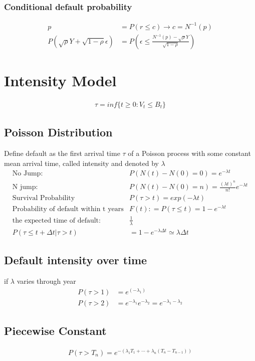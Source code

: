\documentclass{article}
\theoremstyle{definition}
\theoremstyle{thrm}
\theoremstyle{lma}
\theoremstyle{ppst}
\theoremstyle{crlr}
\begin{document}
\subsubsection{Conditional default probability}
\begin{align}
	p &= P(r\leq c) \rightarrow c = N^{-1}(p)\\
	P(\sqrt{\rho}Y+\sqrt{1-\rho}\epsilon) &= P(\epsilon \leq \frac{N^{-1}(p) - \sqrt{\rho} Y}{\sqrt{1-\rho}})
\end{align}

\section{Intensity Model}
\begin{align*}
	\tau = inf\{t\geq0: V_t \leq B_t\}
\end{align*}
\subsection{Poisson Distribution}
Define default as the first arrival time $\tau$ of a Poisson process with some constant mean arrival time, called intensity and denoted by $\lambda$
\begin{align*}
	\text{No Jump: }& P(N(t)-N(0)=0) = e^{-\lambda t}\\
	\text{N jump: }& P(N(t)-N(0)=n) = \frac{(\lambda t )^n}{n!}e^{-\lambda t}\\
	\text{Survival Probability}& P(\tau>t) = exp(-\lambda t)\\
	\text{Probability of default within t years}& F(t): = P(\tau \leq t) = 1-e^{-\lambda t}\\
	\text{the expected time of default: }& \frac{1}{\lambda}\\
	P(\tau \leq t+\Delta t| \tau >t) & = 1-e^{-\lambda\Delta t} \simeq \lambda \Delta t
\end{align*}
\subsection{Default intensity over time}
if $\lambda$ varies through year
\begin{align*}
	P(\tau>1)&= e^(-\lambda_1)\\
	P(\tau>2)&= e^{-\lambda_1}e^{-\lambda_2} = e^{-\lambda_1-\lambda_2}
\end{align*}
\subsection{Piecewise Constant}
\begin{align*}
	P(\tau>T_n) = e^{-(\lambda_1T_1 + \cdots + \lambda_n(T_n - T_{n-1}))}
\end{align*}
\end{document}
